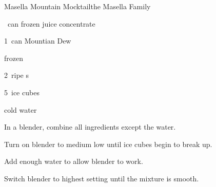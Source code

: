 \begin{recipe}{Masella Mountain Mocktail}{the Masella Family}{}

\begin{ingredients}
\item \half~can frozen  juice concentrate
\item 1~can Mountian Dew
\item \C{\half} frozen 
\item 2~ripe s
\item 5~ice cubes
\item cold water
\end{ingredients}

\begin{directions}
\item In a blender, combine all ingredients except the water.
\item Turn on blender to medium low until ice cubes begin to break up.
\item Add enough water to allow blender to work.
\item Switch blender to highest setting until the mixture is smooth.
\end{directions}

\end{recipe}
